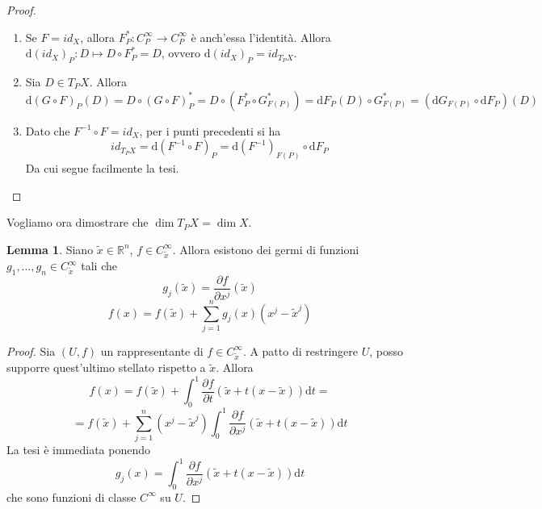 \documentclass[a4paper,11pt]{article}
\theoremstyle{definition}
\theoremstyle{theorem}
\newtheorem{lemma}[teorema]{Lemma}
\begin{document}
\begin{proof}
	\begin{enumerate}
		\item Se $F=id_X$, allora $F^*_P\colon C^\infty_P\to C^\infty_P$ è anch'essa l'identità. Allora $\mathrm{d}(id_X)_P\colon D\mapsto D\circ F^*_P=D$, ovvero $\mathrm{d}(id_X)_P=id_{T_PX}$.
		\item Sia $D\in T_PX$. Allora
		\[\mathrm{d}(G\circ F)_P(D)=D\circ(G\circ F)^*_P=D\circ(F^*_P\circ G^*_{F(P)})=\mathrm{d}F_P(D)\circ G^*_{F(P)}=(\mathrm{d}G_{F(P)}\circ\mathrm{d}F_P)(D)\]
		\item Dato che $F^{-1}\circ F=id_X$, per i punti precedenti si ha 
		\[id_{T_PX}=\mathrm{d}(F^{-1}\circ F)_P=\mathrm{d}(F^{-1})_{F(P)}\circ\mathrm{d}F_P\]
		Da cui segue facilmente la tesi.
	\end{enumerate}
\end{proof}
 Vogliamo ora dimostrare che $\dim T_PX=\dim X$.
\begin{lemma}
	Siano $\tilde{x}\in\mathbb{R}^n$, $f\in C^\infty_{\tilde{x}}$. Allora esistono dei germi di funzioni $g_1,\dots,g_n\in C^\infty_{\tilde{x}}$ tali che \[g_j(\tilde{x})=\frac{\partial f}{\partial x^j}(\tilde x)\]
	\[f(x)=f(\tilde{x})+\sum_{j=1}^{n}g_j(x)(x^j-\tilde{x}^j)\]
\end{lemma}
\begin{proof}
	Sia $(U,f)$ un rappresentante di $f\in C^\infty_{\tilde{x}}$. A patto di restringere $U$, posso supporre quest'ultimo stellato rispetto a $\tilde{x}$. Allora
	\[f(x)=f(\tilde{x})+\int_{0}^{1}\frac{\partial f}{\partial t}(\tilde{x}+t(x-\tilde{x}))\mathrm{d}t=\]
	\[=f(\tilde{x})+\sum_{j=1}^{n}(x^j-\tilde{x}^j)\int_{0}^{1}\frac{\partial f}{\partial x^j}(\tilde{x}+t(x-\tilde{x}))\mathrm{d}t\]
	La tesi è immediata ponendo
	\[g_j(x)=\int_{0}^{1}\frac{\partial f}{\partial x^j}(\tilde{x}+t(x-\tilde{x}))\mathrm{d}t\]
	che sono funzioni di classe $C^\infty$ su $U$.
\end{proof}
\end{document}
